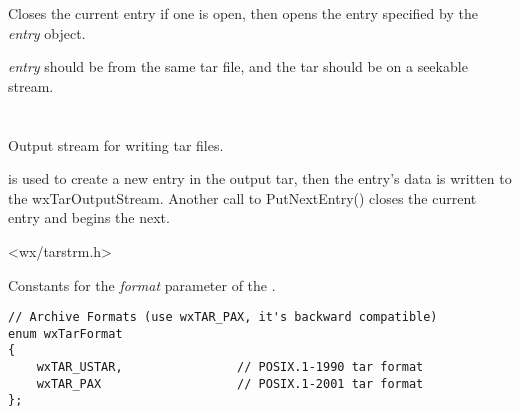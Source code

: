 
Closes the current entry if one is open, then opens the entry specified
by the {\it entry} object.

{\it entry} should be from the same tar file, and the tar should
be on a seekable stream.




%
%

\section{}\label{wxtaroutputstream}

Output stream for writing tar files.

 is used to create
a new entry in the output tar, then the entry's data is written to the
wxTarOutputStream. Another call to PutNextEntry() closes the current
entry and begins the next.




<wx/tarstrm.h>


Constants for the {\it format} parameter of the
 .

\begin{verbatim}
// Archive Formats (use wxTAR_PAX, it's backward compatible)
enum wxTarFormat
{
    wxTAR_USTAR,                // POSIX.1-1990 tar format
    wxTAR_PAX                   // POSIX.1-2001 tar format
};

\end{verbatim}


\\
\\




\label{wxtaroutputstreamwxtaroutputstream}

